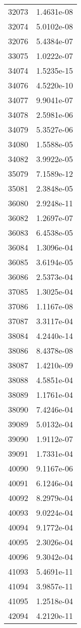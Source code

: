 \begin{table}[h!]
\begin{tabular}{|| c || c |}
32073 & 1.4631e-08 \\
32074 & 5.0102e-08 \\
32076 & 5.4384e-07 \\
33075 & 1.0222e-07 \\
34074 & 1.5235e-15 \\
34076 & 4.5220e-10 \\
34077 & 9.9041e-07 \\
34078 & 2.5981e-06 \\
34079 & 5.3527e-06 \\
34080 & 1.5588e-05 \\
34082 & 3.9922e-05 \\
35079 & 7.1589e-12 \\
35081 & 2.3848e-05 \\
36080 & 2.9248e-11 \\
36082 & 1.2697e-07 \\
36083 & 6.4538e-05 \\
36084 & 1.3096e-04 \\
36085 & 3.6194e-05 \\
36086 & 2.5373e-04 \\
37085 & 1.3025e-04 \\
37086 & 1.1167e-08 \\
37087 & 3.3117e-04 \\
38084 & 4.2440e-14 \\
38086 & 8.4378e-08 \\
38087 & 1.4210e-09 \\
38088 & 4.5851e-04 \\
38089 & 1.1761e-04 \\
38090 & 7.4246e-04 \\
39089 & 5.0132e-04 \\
39090 & 1.9112e-07 \\
39091 & 1.7331e-04 \\
40090 & 9.1167e-06 \\
40091 & 6.1246e-04 \\
40092 & 8.2979e-04 \\
40093 & 9.0224e-04 \\
40094 & 9.1772e-04 \\
40095 & 2.3026e-04 \\
40096 & 9.3042e-04 \\
41093 & 5.4691e-11 \\
41094 & 3.9857e-11 \\
41095 & 1.2518e-04 \\
42094 & 4.2120e-11 \\

\end{tabular}
\end{table}
